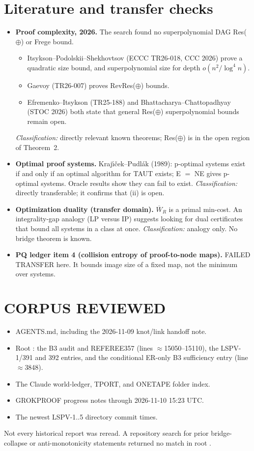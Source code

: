 \documentclass[11pt]{article}
\begin{document}
\section{Literature and transfer checks}
\begin{itemize}
\item \textbf{Proof complexity, 2026.} The search found no superpolynomial DAG Res($\oplus$) or Frege bound.
  \begin{itemize}
  \item Itsykson--Podolskii--Shekhovtsov (ECCC TR26-018, CCC 2026) prove a quadratic size bound, and superpolynomial size for depth $o(n^2/\log^4 n)$.
  \item Gaevoy (TR26-007) proves RevRes($\oplus$) bounds.
  \item Efremenko--Itsykson (TR25-188) and Bhattacharya--Chattopadhyay (STOC 2026) both state that general Res($\oplus$) superpolynomial bounds remain open.
  \end{itemize}
  \emph{Classification:} directly relevant known theorems; Res($\oplus$) is in the open
  region of Theorem~2.
\item \textbf{Optimal proof systems.} Kraj\'\i\v{c}ek--Pudl\'ak (1989): p-optimal systems exist if and only if an
  optimal algorithm for TAUT exists; E $=$ NE gives p-optimal systems. Oracle results show they can fail to exist.
  \emph{Classification:} directly transferable; it confirms that (ii) is open.
\item \textbf{Optimization duality (transfer domain).} $\overline W_R$ is a
  primal min-cost. An integrality-gap analogy (LP versus IP) suggests looking for dual certificates
  that bound all systems in a class at once. \emph{Classification:} analogy only. No bridge theorem is known.
\item \textbf{PQ ledger item 4 (collision entropy of proof-to-node maps).} FAILED TRANSFER
  here. It bounds image size of a fixed map, not the minimum over systems.
\end{itemize}

\section*{CORPUS REVIEWED}
\begin{itemize}
\item AGENTS.md, including the 2026-11-09 knot/link handoff note.
\item Root : the B3 audit and REFEREE357 (lines $\approx$15050--15110), the LSPV-1/391 and 392 entries, and the conditional ER-only B3 sufficiency entry (line $\approx$3848).
\item The Claude world-ledger, TPORT, and ONETAPE folder index.
\item GROKPROOF progress notes through 2026-11-10 15:23 UTC.
\item The newest LSPV-1..5 directory commit times.
\end{itemize}
Not every historical report was reread. A repository search for prior bridge-collapse or
anti-monotonicity statements returned no match in root .
\end{document}
